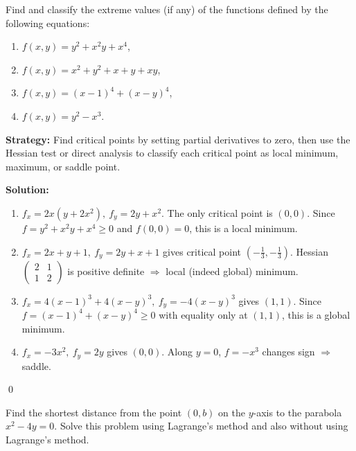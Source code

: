 \begin{problembox}
\begin{problemstatement}
Find and classify the extreme values (if any) of the functions defined by the following equations:
\begin{enumerate}[label=(\alph*)]
    \item \( f(x, y) = y^2 + x^2y + x^4 \),
    \item \( f(x, y) = x^2 + y^2 + x + y + xy \),
    \item \( f(x, y) = (x - 1)^4 + (x - y)^4 \),
    \item \( f(x, y) = y^2 - x^3 \).
\end{enumerate}
\end{problemstatement}
\end{problembox}

\noindent\textbf{Strategy:} Find critical points by setting partial derivatives to zero, then use the Hessian test or direct analysis to classify each critical point as local minimum, maximum, or saddle point.

\bigskip\noindent\textbf{Solution:}
\begin{enumerate}[label=(\alph*)]
    \item $f_x=2x(y+2x^2),\ f_y=2y+x^2$. The only critical point is $(0,0)$. Since $f=y^2+x^2y+x^4\ge 0$ and $f(0,0)=0$, this is a local minimum.
    \item $f_x=2x+y+1,\ f_y=2y+x+1$ gives critical point $(-\tfrac13,-\tfrac13)$. Hessian $\begin{pmatrix}2&1\\1&2\end{pmatrix}$ is positive definite $\Rightarrow$ local (indeed global) minimum.
    \item $f_x=4(x-1)^3+4(x-y)^3,\ f_y=-4(x-y)^3$ gives $(1,1)$. Since $f=(x-1)^4+(x-y)^4\ge0$ with equality only at $(1,1)$, this is a global minimum.
    \item $f_x=-3x^2,\ f_y=2y$ gives $(0,0)$. Along $y=0$, $f=-x^3$ changes sign $\Rightarrow$ saddle.
\end{enumerate}\qed


\begin{problembox}
\begin{problemstatement}
Find the shortest distance from the point \((0, b)\) on the \( y \)-axis to the parabola \( x^2 - 4y = 0 \). Solve this problem using Lagrange's method and also without using Lagrange's method.
\end{problemstatement}
\end{problembox}

